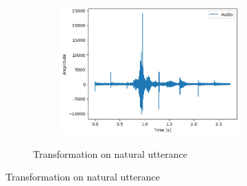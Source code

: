 \documentclass[11pt]{article}
\begin{document}
\begin{figure}
\begin{subfigure}{.5\textwidth}
\begin{subfigure}{.18\textwidth}
  \includegraphics[width=\linewidth]{Bilder/seminat_fear.png}
  \label{fig:sfig2}
\end{subfigure}
\caption{Transformation on natural utterance}
\end{subfigure}


\end{figure}
\end{document}
